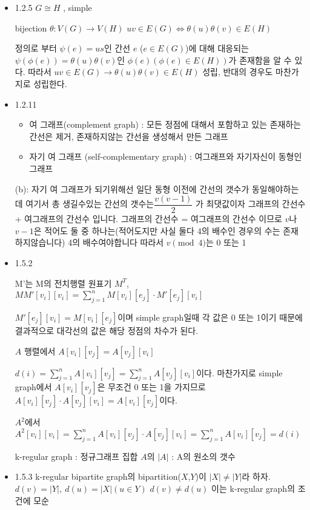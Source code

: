 \documentclass{oblivoir}
\begin{document}
\begin{itemize}
    \item 1.2.5
    $G \cong H$ , simple

    bijection $\theta : V(G) \longrightarrow V(H)$
    $ uv \in E(G) \Leftrightarrow  \theta(u)\theta(v) \in E(H)$

    정의로 부터 $\psi(e) = us$인 간선 $e$ ($e \in E(G)$)에 대해 대응되는 $\psi(\phi(e)) = \theta(u)\theta(v)$인 $\phi(e)(\phi(e) \in E(H))$가 존재함을 알 수 있다. 따라서 $ uv \in E(G) \rightarrow \theta(u)\theta(v) \in E(H)$ 성립, 반대의 경우도 마찬가지로 성립한다.
    \item 1.2.11
    \begin{itemize}
        \item 여 그래프(complement graph) : 모든 정점에 대해서 포함하고 있는 존재하는 간선은 제거, 존재하지않는 간선을 생성해서 만든 그래프
        \item 자기 여 그래프 (self-complementary graph) : 여그래프와 자기자신이 동형인 그래프
    \end{itemize}
    (b): 자기 여 그래프가 되기위해선 일단 동형 이전에 간선의 갯수가 동일해야하는데 여기서 총 생길수있는 간선의 갯수는$\dfrac{v(v-1)}{2}$ 가 최댓값이자 그래프의 간선수 + 여그래프의 간선수 입니다. 그래프의 간선수 = 여그래프의 간선수 이므로 $v$나 $v-1$은 적어도 둘 중 하나는(적어도지만 사실 둘다 4의 배수인 경우의 수는 존재하지않습니다) 4의 배수여야합니다
    따라서 $v\pmod{4}$는 0 또는 1
    
    \item 1.5.2

    M'는 M의 전치행렬 원표기 $M^{T}$,
    $MM'[v_i][v_i] = \sum_{j=1}^n M[v_i][e_j] \cdot M'[e_j][v_i]$

    $ M'[e_j][v_i] = M[v_i][e_j] $이며 simple graph일때 각 값은 0 또는 1이기 때문에 결과적으로 대각선의 값은 해당 정점의 차수가 된다.

    $A$ 행렬에서 $A[v_i][v_j] = A[v_j][v_i]$ 

    $d(i) = \sum_{j=1}^n A[v_i][v_j] = \sum_{j=1}^n A[v_j][v_i]$이다.
    마찬가지로 simple graph에서 $A[v_i][v_j]$은 무조건 0 또는 1을 가지므로 $A[v_i][v_j] \cdot A[v_j][v_i] = A[v_i][v_j]$이다.

    $A^2$에서 $A^2[v_i][v_i] = \sum_{j=1}^n A[v_i][v_j] \cdot A[v_j][v_i]= \sum_{j=1}^n A[v_i][v_j] = d(i)$

    k-regular graph : 정규그래프
    집합 $A$의 $|A|$ : A의 원소의 갯수

    \item 1.5.3
    k-regular bipartite graph의 bipartition($X$,$Y$)이 $|X|\neq |Y|$라 하자. $d(v)=|Y|,\: d(u)=|X|(u \in Y )$ $d(v) \neq d(u)$ 이는 k-regular graph의 조건에 모순


\end{itemize}
\end{document}
